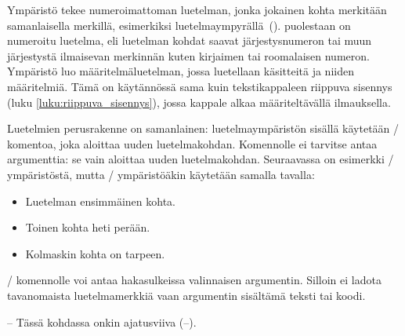 Ympäristö  tekee numeroimattoman luetelman, jonka
jokainen kohta merkitään samanlaisella merkillä, esimerkiksi
luetelmaympyrällä~(\textbullet).  puolestaan on
numeroitu luetelma, eli luetelman kohdat saavat järjestysnumeron tai
muun järjestystä ilmaisevan merkinnän kuten kirjaimen tai roomalaisen
numeron. Ympäristö  luo määritelmäluetelman,
jossa luetellaan käsitteitä ja niiden määritelmiä. Tämä on käytännössä
sama kuin tekstikappaleen riippuva sisennys (luku
\ref{luku:riippuva_sisennys}), jossa kappale alkaa määriteltävällä
ilmauksella.

Luetelmien perusrakenne on samanlainen: luetelmaympäristön sisällä
käytetään \-/ komentoa, joka aloittaa uuden
luetelmakohdan. Komennolle ei tarvitse antaa argumenttia: se vain
aloittaa uuden luetelmakohdan. Seuraavassa on esimerkki
\-/ ympäristöstä, mutta \-/
ympäristöäkin käytetään samalla tavalla:

\begin{koodilohkosis}
\begin{itemize}
\item Luetelman ensimmäinen kohta.
\item Toinen kohta heti perään.
\item Kolmaskin kohta on tarpeen.
\end{itemize}
\end{koodilohkosis}

\-/ komennolle voi antaa hakasulkeissa valinnaisen
argumentin. Silloin ei ladota tavanomaista luetelmamerkkiä vaan
argumentin sisältämä teksti tai koodi.

\begin{koodilohkosis}
\item[--] Tässä kohdassa onkin ajatusviiva (--).
\end{koodilohkosis}

